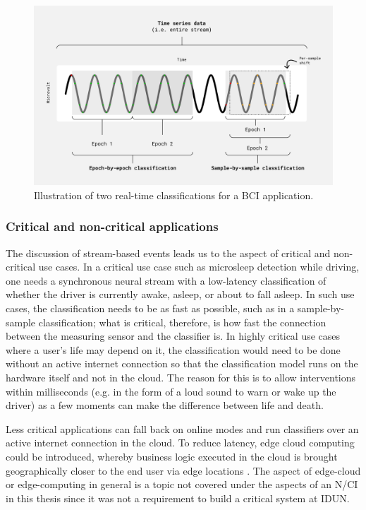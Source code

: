 \begin{figure}[!ht]
  \centering
  \includegraphics[width=\linewidth]{per-sample.png}
  \caption{Illustration of two real-time classifications for a BCI application.}
  \label{fig:per-sample}
\end{figure}

\subsubsection{Critical and non-critical applications}
\label{chapter5-critical-and-non-critical-applications}

The discussion of stream-based events leads us to the aspect of critical and non-critical use cases. In a critical use case such as microsleep detection while driving, one needs a synchronous neural stream with a low-latency classification of whether the driver is currently awake, asleep, or about to fall asleep. In such use cases, the classification needs to be as fast as possible, such as in a sample-by-sample classification; what is critical, therefore, is how fast the connection between the measuring sensor and the classifier is. In highly critical use cases where a user’s life may depend on it, the classification would need to be done without an active internet connection so that the classification model runs on the hardware itself and not in the cloud. The reason for this is to allow interventions within milliseconds (e.g. in the form of a loud sound to warn or wake up the driver) as a few moments can make the difference between life and death.

Less critical applications can fall back on online modes and run classifiers over an active internet connection in the cloud. To reduce latency, edge cloud computing could be introduced, whereby business logic executed in the cloud is brought geographically closer to the end user via edge locations \citep{nomios_what_nodate}. The aspect of edge-cloud or edge-computing in general is a topic not covered under the aspects of an N/CI in this thesis since it was not a requirement to build a critical system at IDUN.

